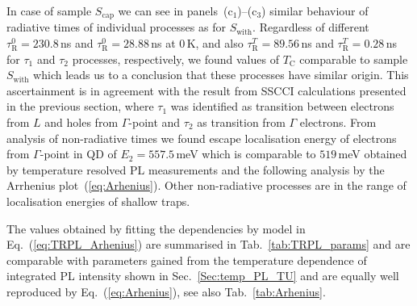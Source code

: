 In case of sample $S_\mathrm{cap}$ we can see in panels~(c$_1$)--(c$_3$) similar behaviour of radiative times of individual processes as for $S_\mathrm{with}$. Regardless of different $\tau_\mathrm{R}^0=230.8$$\,$ns and $\tau_\mathrm{R}^0=28.88$$\,$ns at 0$\,$K, and also $\tau_\mathrm{R}^T=89.56$$\,$ns and $\tau_\mathrm{R}^T=0.28$$\,$ns for $\tau_1$ and $\tau_2$ processes, respectively, we found values of $T_\mathrm{C}$ comparable to sample $S_\mathrm{with}$ which leads us to a conclusion that these processes have similar origin. This ascertainment is in agreement with the result from SSCCI calculations presented in the previous section, where $\tau_1$ was identified as transition between electrons from $L$ and holes from $\Gamma$-point and $\tau_2$ as transition from $\Gamma$ electrons. From analysis of non-radiative times we found escape localisation energy of electrons from $\Gamma$-point in QD of $E_2=557.5$$\,$meV which is comparable to $519$$\,$meV obtained by temperature resolved PL measurements and the following analysis by the Arrhenius plot~(\ref{eq:Arhenius}). Other non-radiative processes are in the range of localisation energies of shallow traps.




The values obtained by fitting the dependencies by model in Eq.~(\ref{eq:TRPL_Arhenius}) are summarised in Tab.~\ref{tab:TRPL_params} and are comparable with parameters gained from the temperature dependence of integrated PL intensity shown in Sec.~\ref{Sec:temp_PL_TU} and are equally well reproduced by Eq.~(\ref{eq:Arhenius}), see also Tab.~\ref{tab:Arhenius}.
%

